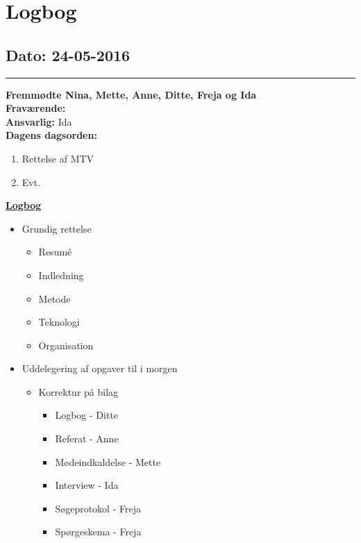 \chapter{Logbog}
\section{Dato: 24-05-2016}
\hrule
\textbf{Fremmødte Nina, Mette, Anne, Ditte, Freja og Ida } \\
\textbf{Fraværende: } \\
\textbf{Ansvarlig:} Ida  \\
\textbf{Dagens dagsorden: }
\begin{enumerate}
\item Rettelse af MTV
\item Evt.
\end{enumerate}

\underline{\textbf{Logbog}}
\begin{itemize}
\item Grundig rettelse
\begin{itemize}
\item Resumé
\item Indledning
\item Metode
\item Teknologi
\item Organisation
\end{itemize}
\item Uddelegering af opgaver til i morgen
\begin{itemize}
\item Korrektur på bilag
\begin{itemize}
\item Logbog - Ditte
\item Referat - Anne
\item Mødeindkaldelse - Mette
\item Interview - Ida
\item Søgeprotokol - Freja
\item Spørgeskema - Freja
\end{itemize}
\end{itemize}
\end{itemize}
\newpage